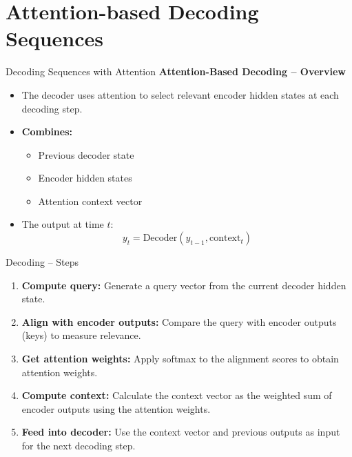 \section{Attention-based Decoding Sequences}
\begin{frame}{Decoding Sequences with Attention}
    \textbf{Attention-Based Decoding – Overview}

    \begin{itemize}
        \item The decoder uses attention to select relevant encoder hidden states at each decoding step.
        \item \textbf{Combines:}
        \begin{itemize}
            \item Previous decoder state
            \item Encoder hidden states
            \item Attention context vector
        \end{itemize}
        \item The output at time $t$:
        \[
            y_t = \mathrm{Decoder}(y_{t-1}, \text{context}_t)
        \]
    \end{itemize}
\end{frame}

\begin{frame}{Decoding – Steps}
    \begin{enumerate}
        \item \textbf{Compute query:} Generate a query vector from the current decoder hidden state.
        \item \textbf{Align with encoder outputs:} Compare the query with encoder outputs (keys) to measure relevance.
        \item \textbf{Get attention weights:} Apply softmax to the alignment scores to obtain attention weights.
        \item \textbf{Compute context:} Calculate the context vector as the weighted sum of encoder outputs using the attention weights.
        \item \textbf{Feed into decoder:} Use the context vector and previous outputs as input for the next decoding step.
    \end{enumerate}
\end{frame}

